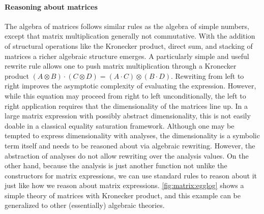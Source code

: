 \paragraph{Reasoning about matrices}
The algebra of matrices follows similar rules as the algebra of simple numbers,
 except that matrix multiplication generally not commutative.
With the addition of structural operations like the Kronecker product, direct sum, and stacking of matrices a richer algebraic structure emerges.
A particularly simple and useful rewrite rule allows one to
 push matrix multiplication through a Kronecker product
 $(A \otimes B) \cdot (C \otimes D) = (A \cdot C) \otimes (B \cdot D)$.
Rewriting from left to right improves the asymptotic complexity of evaluating the expression.
However,
 while this equation may proceed from right to left unconditionally,
 the left to right application requires that the dimensionality of the matrices line up.
In a large matrix expression with possibly abstract dimensionality,
 this is not easily doable in a classical equality saturation framework.
Although one may be tempted to express dimensionality
 with \eclass analyses,
 the dimensionality is a symbolic term itself and needs to be reasoned about via algebraic rewriting.
However, the abstraction of \eclass analyses do not allow rewriting over the analysis values.
On the other hand, because the analysis is just another function
 not unlike the constructors for matrix expressions,
 we can use standard \egglog rules to reason about it
 just like how we reason about matrix expressions.
\autoref{fig:matrix:egglog} shows
 a simple theory of matrices with Kronecker product,
 and this example can be generalized to
 other (essentially) algebraic theories.
